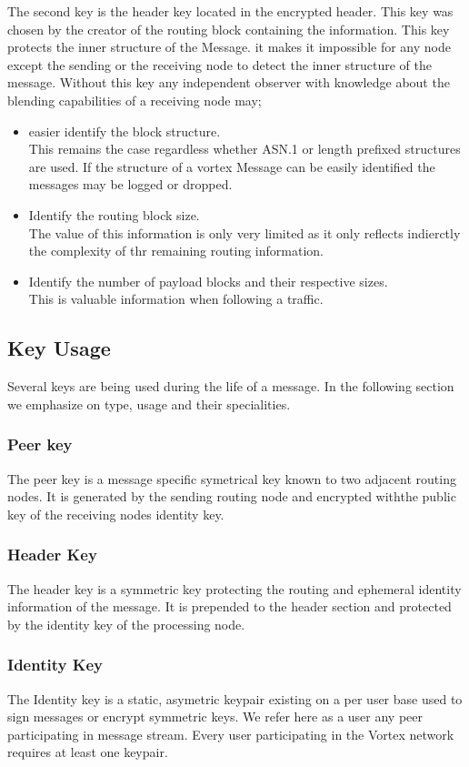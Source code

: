 The second key is the header key located in the encrypted header. This key was chosen by the creator of the routing block containing the information. This key protects the inner structure of the Message. it makes it impossible for any node except the sending or the receiving node to detect the inner structure of the message. Without this key any independent observer with knowledge about the blending capabilities of a receiving node may;
\begin{itemize}
	\item easier identify the block structure.\\ 
	This remains the case regardless whether ASN.1 or length prefixed structures are used. If the structure of a vortex Message can be easily identified the messages may be logged or dropped.
	\item Identify the routing block size.\\
	The value of this information is only very limited as it only reflects indierctly the complexity of thr remaining routing information.
	\item Identify the number of payload blocks and their respective sizes. \\
	This is valuable information when following a traffic.
\end{itemize}

\subsection{Key Usage}
Several keys are being used during the life of a message. In the following section we emphasize on type, usage and their specialities.

\subsubsection{Peer key}
The peer key is a message specific symetrical key known to two adjacent routing nodes. It is generated by the sending routing node and encrypted withthe public key of the receiving nodes identity key.

\subsubsection{Header Key}
The header key is a symmetric key protecting the routing and ephemeral identity information of the message. It is prepended to the header section and protected by the identity key of the processing node.

\subsubsection{Identity Key}
The Identity key is a static, asymetric keypair existing on a per user base used to sign messages or encrypt symmetric keys. We refer here as a user any peer participating in  message stream. Every user participating in the Vortex network requires at least one keypair. 

